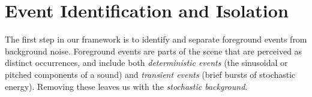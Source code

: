 \documentclass{acmsiggraph}               %
\begin{document}
\section{Event Identification and Isolation}

The first step in our framework is to identify and separate foreground events from 
background noise. Foreground events are parts of the scene that are perceived as distinct 
occurrences, and include both \emph{deterministic events} (the 
sinusoidal or pitched components of a sound) and \emph{transient events} (brief bursts 
of stochastic energy). Removing these leaves us with the \emph{stochastic background}. 


%
%
%
%
\end{document}
